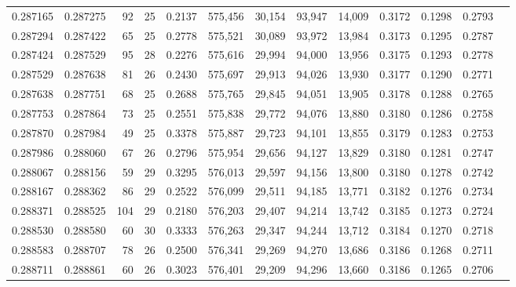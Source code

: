 \begin{tabular}{rrrrrrrrrrrrr}
0.287165 & 0.287275 &  92 &  25 &                                     0.2137 & 575,456 &  30,154 &  93,947 &  14,009 & 0.3172 & 0.1298 & 0.2793 \\
0.287294 & 0.287422 &  65 &  25 &                                     0.2778 & 575,521 &  30,089 &  93,972 &  13,984 & 0.3173 & 0.1295 & 0.2787 \\
0.287424 & 0.287529 &  95 &  28 &                                     0.2276 & 575,616 &  29,994 &  94,000 &  13,956 & 0.3175 & 0.1293 & 0.2778 \\
0.287529 & 0.287638 &  81 &  26 &                                     0.2430 & 575,697 &  29,913 &  94,026 &  13,930 & 0.3177 & 0.1290 & 0.2771 \\
0.287638 & 0.287751 &  68 &  25 &                                     0.2688 & 575,765 &  29,845 &  94,051 &  13,905 & 0.3178 & 0.1288 & 0.2765 \\
0.287753 & 0.287864 &  73 &  25 &                                     0.2551 & 575,838 &  29,772 &  94,076 &  13,880 & 0.3180 & 0.1286 & 0.2758 \\
0.287870 & 0.287984 &  49 &  25 &                                     0.3378 & 575,887 &  29,723 &  94,101 &  13,855 & 0.3179 & 0.1283 & 0.2753 \\
0.287986 & 0.288060 &  67 &  26 &                                     0.2796 & 575,954 &  29,656 &  94,127 &  13,829 & 0.3180 & 0.1281 & 0.2747 \\
0.288067 & 0.288156 &  59 &  29 &                                     0.3295 & 576,013 &  29,597 &  94,156 &  13,800 & 0.3180 & 0.1278 & 0.2742 \\
0.288167 & 0.288362 &  86 &  29 &                                     0.2522 & 576,099 &  29,511 &  94,185 &  13,771 & 0.3182 & 0.1276 & 0.2734 \\
0.288371 & 0.288525 & 104 &  29 &                                     0.2180 & 576,203 &  29,407 &  94,214 &  13,742 & 0.3185 & 0.1273 & 0.2724 \\
0.288530 & 0.288580 &  60 &  30 &                                     0.3333 & 576,263 &  29,347 &  94,244 &  13,712 & 0.3184 & 0.1270 & 0.2718 \\
0.288583 & 0.288707 &  78 &  26 &                                     0.2500 & 576,341 &  29,269 &  94,270 &  13,686 & 0.3186 & 0.1268 & 0.2711 \\
0.288711 & 0.288861 &  60 &  26 &                                     0.3023 & 576,401 &  29,209 &  94,296 &  13,660 & 0.3186 & 0.1265 & 0.2706 \\

\end{tabular}
